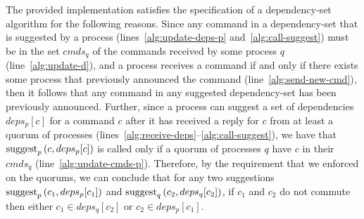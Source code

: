The provided implementation satisfies the specification of a dependency-set algorithm for the following reasons. Since any command in a dependency-set that is suggested by a process (lines~\ref{alg:update-deps-p} and~\ref{alg:call-suggest}) must be in the set $cmds_q$ of the commands received by some process $q$ (line~\ref{alg:update-d}), and a process receives a command if and only if there exists some process that previously announced the command (line~\ref{alg:send-new-cmd}), then it follows that any command in any suggested dependency-set has been previously announced. Further, since a process can suggest a set of dependencies $deps_p[c]$ for a command $c$ after it has received a reply for $c$ from at least a quorum of processes (lines~\ref{alg:receive-deps}--\ref{alg:call-suggest}), we have that $\operatorname{suggest}_p \left( c,deps_p[c]\right)$ is called only if a quorum of processes $q$ have $c$ in their $cmds_q$ (line~\ref{alg:update-cmds-p}). Therefore, by the requirement that we enforced on the quorums, we can conclude that for any two suggestions $\operatorname{suggest}_p \left( c_1,deps_p[c_1]\right)$ and $\operatorname{suggest}_q \left( c_2,deps_q[c_2]\right)$,  if $c_1$ and $c_2$ do not commute then either $c_1\in deps_q[c_2]$ or $c_2 \in deps_p[c_1]$.

